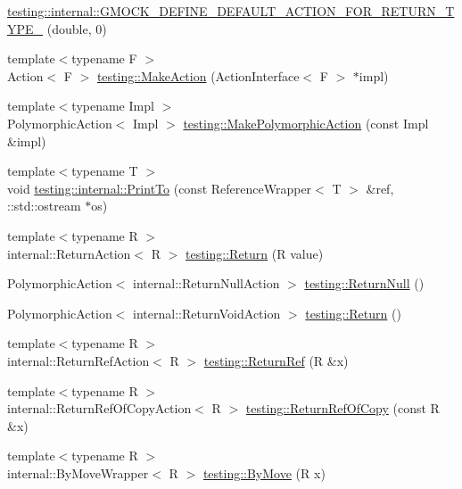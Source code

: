 \begin{DoxyCompactItemize}
\mbox{\hyperlink{namespacetesting_1_1internal_a7ba92aa33f4968c902623cd02e445020}{testing\+::internal\+::\+G\+M\+O\+C\+K\+\_\+\+D\+E\+F\+I\+N\+E\+\_\+\+D\+E\+F\+A\+U\+L\+T\+\_\+\+A\+C\+T\+I\+O\+N\+\_\+\+F\+O\+R\+\_\+\+R\+E\+T\+U\+R\+N\+\_\+\+T\+Y\+P\+E\+\_\+}} (double, 0)
\item 
{\footnotesize template$<$typename F $>$ }\\Action$<$ F $>$ \mbox{\hyperlink{namespacetesting_ae6b9960db2b2685e043ce5215291f5b8}{testing\+::\+Make\+Action}} (Action\+Interface$<$ F $>$ $\ast$impl)
\item 
{\footnotesize template$<$typename Impl $>$ }\\Polymorphic\+Action$<$ Impl $>$ \mbox{\hyperlink{namespacetesting_a36bd06c5ea972c6df0bd9f40a7a94c65}{testing\+::\+Make\+Polymorphic\+Action}} (const Impl \&impl)
\item 
{\footnotesize template$<$typename T $>$ }\\void \mbox{\hyperlink{namespacetesting_1_1internal_a8fd10cc30084c36a89c74868c8bd53f8}{testing\+::internal\+::\+Print\+To}} (const Reference\+Wrapper$<$ T $>$ \&ref, \+::std\+::ostream $\ast$os)
\item 
{\footnotesize template$<$typename R $>$ }\\internal\+::\+Return\+Action$<$ R $>$ \mbox{\hyperlink{namespacetesting_af6d1c13e9376c77671e37545cd84359c}{testing\+::\+Return}} (R value)
\item 
Polymorphic\+Action$<$ internal\+::\+Return\+Null\+Action $>$ \mbox{\hyperlink{namespacetesting_aa0331596e269114da101f810d3a1b88b}{testing\+::\+Return\+Null}} ()
\item 
Polymorphic\+Action$<$ internal\+::\+Return\+Void\+Action $>$ \mbox{\hyperlink{namespacetesting_a8da8e53d2e7bc4e3c531f7435ad04823}{testing\+::\+Return}} ()
\item 
{\footnotesize template$<$typename R $>$ }\\internal\+::\+Return\+Ref\+Action$<$ R $>$ \mbox{\hyperlink{namespacetesting_a18eda8fe9c89ee856c199a2e04ca1641}{testing\+::\+Return\+Ref}} (R \&x)
\item 
{\footnotesize template$<$typename R $>$ }\\internal\+::\+Return\+Ref\+Of\+Copy\+Action$<$ R $>$ \mbox{\hyperlink{namespacetesting_ac1b75444c89371dc25ebcfcc48336201}{testing\+::\+Return\+Ref\+Of\+Copy}} (const R \&x)
\item 
{\footnotesize template$<$typename R $>$ }\\internal\+::\+By\+Move\+Wrapper$<$ R $>$ \mbox{\hyperlink{namespacetesting_acaa432211a3aec62e3d0f24b47bd2dae}{testing\+::\+By\+Move}} (R x)

\end{DoxyCompactItemize}
